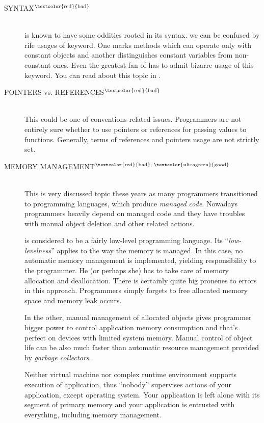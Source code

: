 \begin{description}
\item[SYNTAX$^{\text{\textcolor{red}{bad}}}$]\hfill \\
\cpp is known to have some oddities rooted in its syntax. \Eg we can be confused by rife usages of keyword. One marks methods which can operate only with constant objects and another distinguishes constant variables from non-constant ones. Even the greatest fan of \cpp has to admit bizarre usage of this keyword. You can read about this topic in \citep[p.~90-92, p.~537]{prata:cprimer}.

\item[POINTERS vs. REFERENCES$^{\text{\textcolor{red}{bad}}}$]\hfill \\
This could be one of conventions-related issues. Programmers are not entirely sure whether to use pointers or references for passing values to functions. Generally, terms of references and pointers usage are not strictly set.

\item[MEMORY MANAGEMENT$^{\text{\textcolor{red}{bad}, \textcolor{ultragreen}{good}}}$]\hfill \\
This is very discussed topic these years as many programmers transitioned to programming languages, which produce
\emph{managed code}. Nowadays programmers heavily depend on managed code and they have troubles with manual
object deletion and other related actions.

\cpp is considered to be a fairly low-level programming language. Its \enquote{\textit{low-levelness}} applies to the way the memory is managed. In this case, no automatic memory management is implemented, yielding responsibility to the programmer. He (or perhaps she) has to take care of memory allocation and deallocation. There is certainly quite big pronenes to errors in this approach. Programmers simply forgets to free allocated memory space and memory leak occurs.

In the other, manual management of allocated objects gives programmer bigger power to control application memory consumption and that's perfect on devices with limited system memory. Manual control of object life can be also much faster than automatic resource management provided by \textit{garbage collectors}.

Neither virtual machine nor complex runtime environment supports execution of \cpp application, thus \enquote{nobody} supervises actions of your application, except operating system. Your application is left alone with its segment of primary memory and your application is entrusted with everything, including memory management.


\end{description}
